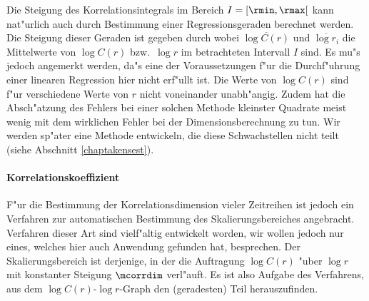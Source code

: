 Die Steigung des Korrelationsintegrals im Bereich $I=[\rmin,\rmax[$ kann nat"urlich auch
durch Bestimmung einer Regressionsgeraden berechnet werden. Die Steigung dieser Geraden
ist gegeben durch
wobei $\overline{\log C(r)}$ und $\overline{\log r_i}$ die Mittelwerte von $\log C(r)$
bzw.\ $\log r$ im betrachteten Intervall $I$ sind. Es mu"s jedoch angemerkt werden, da"s
eine der Voraussetzungen f"ur die Durchf"uhrung einer linearen Regression hier nicht
erf"ullt ist. Die Werte von $\log C(r)$ sind f"ur verschiedene Werte von $r$ nicht
voneinander unabh"angig. Zudem hat die Absch"atzung des Fehlers bei einer solchen Methode
kleinster Quadrate meist wenig mit dem wirklichen Fehler bei der Dimensionsberechnung zu
tun. Wir werden sp"ater eine Methode entwickeln, die diese Schwachstellen nicht teilt (siehe
Abschnitt \ref{chaptakensest}).

\paragraph{Korrelationskoeffizient}
F"ur die Bestimmung der Korrelationsdimension vieler Zeitreihen ist jedoch ein Verfahren
zur automatischen Bestimmung des Skalierungsbereiches angebracht. Verfahren dieser Art
sind vielf"altig entwickelt worden, wir wollen jedoch nur eines, welches hier auch
Anwendung gefunden hat, besprechen. Der Skalierungsbereich ist derjenige, in der die
Auftragung $\log C(r)$ "uber $\log r$ mit konstanter Steigung $\mcorrdim$
verl"auft. Es ist also Aufgabe des Verfahrens, aus dem $\log C(r)$-$\log r$-Graph den
\naja(geradesten) Teil herauszufinden. 

